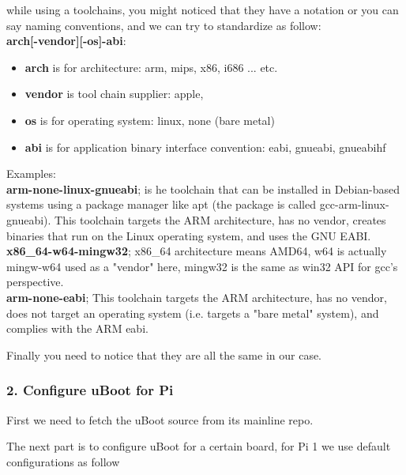 \documentclass{article}
\begin{document}
\begin{mybox}[title={Note: compiler toolchains notations}]
while using a toolchains, you might noticed that they have a notation or you can say naming conventions, and we can try to standardize as follow:\\
\textbf{arch[-vendor][-os]-abi}:
\begin{itemize}
    \item \textbf{arch} is for architecture: arm, mips, x86, i686 ... etc.
    \item \textbf{vendor} is tool chain supplier: apple,
    \item \textbf{os} is for operating system: linux, none (bare metal)
    \item \textbf{abi} is for application binary interface convention: eabi, gnueabi, gnueabihf
\end{itemize}

Examples:\\
\textbf{arm-none-linux-gnueabi}; is he toolchain that can be installed in Debian-based systems using a package manager like apt (the package is called gcc-arm-linux-gnueabi). This toolchain targets the ARM architecture, has no vendor, creates binaries that run on the Linux operating system, and uses the GNU EABI.\\
\textbf{x86\_64-w64-mingw32}; x86\_64 architecture means AMD64, w64 is actually mingw-w64 used as a "vendor" here, mingw32 is the same as win32 API for gcc's perspective.\\
\textbf{arm-none-eabi}; This toolchain targets the ARM architecture, has no vendor, does not target an operating system (i.e. targets a "bare metal" system), and complies with the ARM eabi.\\

\end{mybox}

Finally you need to notice that they are all the same in our case.

\subsubsection{2. Configure uBoot for Pi}
First we need to fetch the uBoot source from its mainline repo.


The next part is to configure uBoot for a certain board, for Pi 1 we use default configurations as follow 

\end{document}
